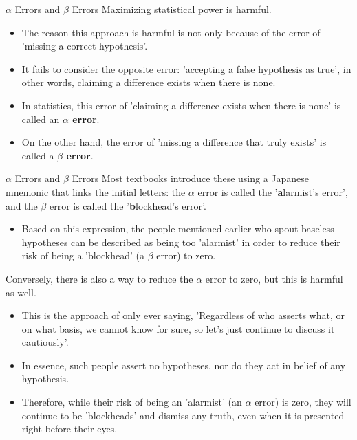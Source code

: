 \documentclass[dvipdfmx, autodetect-engine, aspectratio=169, 10.5pt]{beamer}
\begin{document}
\begin{frame}{$\alpha$ Errors and $\beta$ Errors}
	Maximizing statistical power is harmful.
	\begin{itemize}
		\item The reason this approach is harmful is not only because of the error of 'missing a correct hypothesis'.
		\item It fails to consider the opposite error: 'accepting a false hypothesis as true', in other words, claiming a difference exists when there is none.
		      \vspace{5mm}
		\item In statistics, this error of 'claiming a difference exists when there is none' is called an \textbf{$\alpha$ error}.
		      \vspace{5mm}
		\item On the other hand, the error of 'missing a difference that truly exists' is called a \textbf{$\beta$ error}.
	\end{itemize}
\end{frame}

\begin{frame}{$\alpha$ Errors and $\beta$ Errors}
	Most textbooks introduce these using a Japanese mnemonic that links the initial letters: the $\alpha$ error is called the '\textbf{a}larmist's error', and the $\beta$ error is called the '\textbf{b}lockhead's error'.
	\begin{itemize}
		\item Based on this expression, the people mentioned earlier who spout baseless hypotheses can be described as being too 'alarmist' in order to reduce their risk of being a 'blockhead' (a $\beta$ error) to zero.
	\end{itemize}
	Conversely, there is also a way to reduce the $\alpha$ error to zero, but this is harmful as well.
	\begin{itemize}
		\item This is the approach of only ever saying, 'Regardless of who asserts what, or on what basis, we cannot know for sure, so let's just continue to discuss it cautiously'.
		\item In essence, such people assert no hypotheses, nor do they act in belief of any hypothesis.
		\item Therefore, while their risk of being an 'alarmist' (an $\alpha$ error) is zero, they will continue to be 'blockheads' and dismiss any truth, even when it is presented right before their eyes.
	\end{itemize}
\end{frame}
\end{document}
